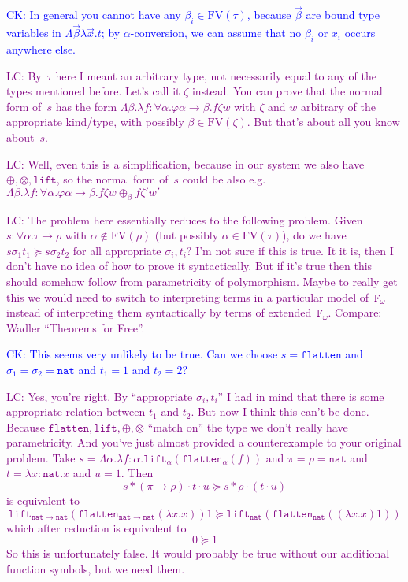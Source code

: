 \documentclass[runningheads,a4paper]{llncs}
\newcommand{\Fomega}{\mathtt{F}_\omega}
\newcommand{\arrtype}{\rightarrow}
\newcommand{\FV}{\mathrm{FV}}
\newcommand{\nat}{\mathtt{nat}}
\newcommand{\flatten}{\mathtt{flatten}}
\newcommand{\lift}{\mathtt{lift}}
\newcommand{\CK}[1]{\textcolor{blue}{CK: #1}}
\newcommand{\LC}[1]{\textcolor{purple}{LC: #1}}
\begin{document}
\CK{In general you cannot have any $\beta_i \in \FV(\tau)$, because
  $\vec{\beta}$ are bound type variables in $\Lambda\vec{\beta}\lambda
  \vec{x}.t$; by $\alpha$-conversion, we can assume that no $\beta_i$
  or $x_i$ occurs anywhere else.}

\LC{By~$\tau$ here I meant an arbitrary type, not necessarily equal to
  any of the types mentioned before. Let's call it $\zeta$
  instead. You can prove that the normal form of~$s$ has the form
  $\Lambda \beta . \lambda f : \forall \alpha . \varphi \alpha \to
  \beta . f \zeta w$ with $\zeta$ and $w$ arbitrary of the appropriate
  kind/type, with possibly $\beta \in \FV(\zeta)$. But that's about
  all you know about~$s$.}

\LC{Well, even this is a simplification, because in our system we also
  have $\oplus,\otimes,\lift$, so the normal form of~$s$ could be also
  e.g.~$\Lambda \beta . \lambda f : \forall \alpha . \varphi \alpha
  \to \beta . f \zeta w \oplus_\beta f \zeta' w'$}

\LC{The problem here essentially reduces to the following
  problem. Given $s : \forall \alpha . \tau \to \rho$ with $\alpha
  \notin \FV(\rho)$ (but possibly $\alpha \in \FV(\tau)$), do we have
  $s \sigma_1 t_1 \succeq s \sigma_2 t_2$ for all appropriate
  $\sigma_i,t_i$? I'm not sure if this is true. It it is, then I don't
  have no idea of how to prove it syntactically. But if it's true then
  this should somehow follow from parametricity of polymorphism. Maybe
  to really get this we would need to switch to interpreting terms in
  a particular model of~$\Fomega$ instead of interpreting them
  syntactically by terms of extended~$\Fomega$. Compare: Wadler
  ``Theorems for Free''.}

\CK{This seems very unlikely to be true. Can we choose $s =
\flatten$ and $\sigma_1 = \sigma_2 = \mathtt{nat}$ and $t_1 = 1$ and
$t_2 = 2$?}

\LC{Yes, you're right. By ``appropriate $\sigma_i,t_i$'' I had in mind
  that there is some appropriate relation between $t_1$ and $t_2$. But
  now I think this can't be done. Because
  $\flatten,\lift,\oplus,\otimes$ ``match on'' the type we don't
  really have parametricity. And you've just almost provided a
  counterexample to your original problem. Take $s = \Lambda \alpha
  . \lambda f : \alpha . \lift_\alpha(\flatten_\alpha(f))$ and $\pi =
  \rho = \nat$ and $t = \lambda x : \nat . x$ and $u = 1$. Then
  \[
  s * (\pi \arrtype \rho) \cdot t \cdot u \succeq s * \rho \cdot (t \cdot u)
  \]
  is equivalent to
  \[
  \lift_{\nat\arrtype\nat} (\flatten_{\nat\arrtype\nat} (\lambda x . x)) 1 \succeq \lift_\nat(\flatten_\nat ((\lambda x . x) 1))
  \]
  which after reduction is equivalent to
  \[
  0 \succeq 1
  \]
  So this is unfortunately false. It would probably be true without
  our additional function symbols, but we need them.}
\end{document}

